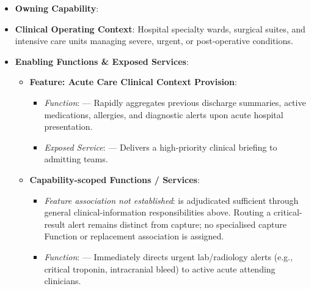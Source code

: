 \begin{itemize}

\item 
\textbf{Owning Capability}: \texttt{}



\item 
\textbf{Clinical Operating Context}: Hospital specialty wards, surgical suites, and intensive care units managing severe, urgent, or post-operative conditions.



\item 
\textbf{Enabling Functions \& Exposed Services}:


\begin{itemize}

\item 
\textbf{Feature: Acute Care Clinical Context Provision}:


\begin{itemize}

\item 
\emph{Function}: \texttt{} — Rapidly aggregates previous discharge summaries, active medications, allergies, and diagnostic alerts upon acute hospital presentation.



\item 
\emph{Exposed Service}: \texttt{} — Delivers a high-priority clinical briefing to admitting teams.



\end{itemize}


\item 
\textbf{Capability-scoped Functions /\allowbreak{} Services}:


\begin{itemize}

\item 
\emph{Feature association not established}: \texttt{} is adjudicated sufficient through general clinical-information responsibilities above. Routing a critical-result alert remains distinct from capture; no specialised capture Function or replacement association is assigned.



\item 
\emph{Function}: \texttt{} — Immediately directs urgent lab/\allowbreak{}radiology alerts (e.g., critical troponin, intracranial bleed) to active acute attending clinicians.




\end{itemize}
\end{itemize}
\end{itemize}
